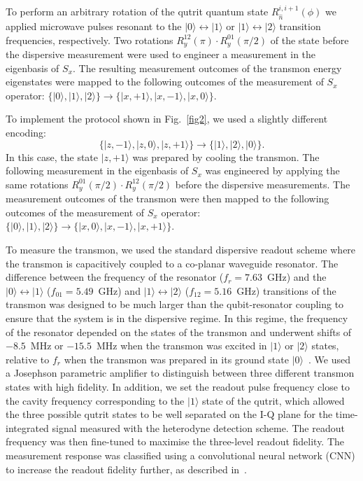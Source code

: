 \documentclass[l1pt]{elsarticle}
\begin{document}
To perform an arbitrary rotation of the qutrit quantum state $R_{\hat n}^{i,i+1}(\phi)$ we applied microwave pulses resonant to the $|0\rangle  \leftrightarrow |1\rangle$ or $|1\rangle \leftrightarrow |2\rangle$ transition frequencies, respectively. Two rotations $R^{12}_y(\pi)\cdot R^{01}_y(\pi/2)$ of the state before the dispersive measurement were used to engineer a measurement in the eigenbasis of $S_x$. The resulting measurement outcomes of the transmon energy eigenstates were mapped to the following outcomes of the measurement of $S_x$ operator: $\{|0\rangle,|1\rangle,|2\rangle\} \rightarrow \{|x,+1\rangle,|x,-1\rangle,|x,0\rangle\}$.

To implement the protocol shown in Fig.~\ref{fig2}, we used a slightly different encoding:
\begin{equation}
\{|z,-1\rangle,|z,0\rangle,|z,+1\rangle\} \rightarrow \{|1\rangle,|2\rangle,|0\rangle\}.
\end{equation}
In this case, the state $|z,+1\rangle$ was prepared by cooling the transmon. The following measurement in the eigenbasis of $S_x$ was engineered by applying the same rotations $R^{01}_y(\pi/2)\cdot R^{12}_y(\pi/2)$ before the dispersive measurements. The measurement outcomes of the transmon were then mapped to the following outcomes of the measurement of $S_x$ operator: $\{|0\rangle,|1\rangle,|2\rangle\} \rightarrow \{|x,0\rangle,|x,-1\rangle,|x,+1\rangle\}$.

To measure the transmon, we used the standard dispersive readout scheme where the transmon is capacitively coupled to a co-planar waveguide resonator. The difference between the frequency of the resonator ($f_r = 7.63$~GHz) and the $|0\rangle\leftrightarrow|1\rangle$ ($f_{01} = 5.49$~GHz) and $|1\rangle\leftrightarrow|2\rangle$ ($f_{12} = 5.16$~GHz) transitions of the transmon was designed to be much larger than the qubit-resonator coupling to ensure that the system is in the dispersive regime. In this regime, the frequency of the resonator depended on the states of the transmon and underwent shifts of $-8.5$~MHz or $-15.5$~MHz when the transmon was excited in $|1\rangle$ or $|2\rangle$ states, relative to $f_r$ when the transmon was prepared in its ground state $|0\rangle$~\cite{Koch2007}. We used a Josephson parametric amplifier to distinguish between three different transmon states with high fidelity. In addition, we set the readout pulse frequency close to the cavity frequency corresponding to the $|1\rangle$ state of the qutrit, which allowed the three possible qutrit states to be well separated on the I-Q plane for the time-integrated signal measured with the heterodyne detection scheme. The readout frequency was then fine-tuned to maximise the three-level readout fidelity. The measurement response was classified using a convolutional neural network (CNN) to increase the readout fidelity further, as described in~\cite{navarathnaNeuralNetworksOnthefly2021}.
\end{document}
